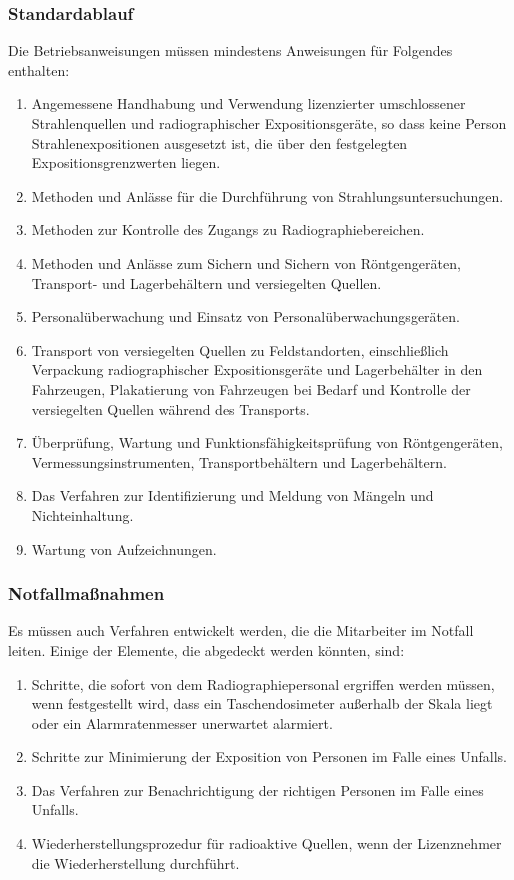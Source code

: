 {\subsubsection{Standardablauf}
Die Betriebsanweisungen müssen mindestens Anweisungen für Folgendes enthalten:
\begin{enumerate}
\item Angemessene Handhabung und Verwendung lizenzierter umschlossener Strahlenquellen und radiographischer Expositionsgeräte, so dass keine Person Strahlenexpositionen ausgesetzt ist, die über den festgelegten Expositionsgrenzwerten liegen.
\item Methoden und Anlässe für die Durchführung von Strahlungsuntersuchungen.
\item Methoden zur Kontrolle des Zugangs zu Radiographiebereichen.
\item Methoden und Anlässe zum Sichern und Sichern von Röntgengeräten, Transport- und Lagerbehältern und versiegelten Quellen.
\item Personalüberwachung und Einsatz von Personalüberwachungsgeräten.
\item Transport von versiegelten Quellen zu Feldstandorten, einschließlich Verpackung radiographischer Expositionsgeräte und Lagerbehälter in den Fahrzeugen, Plakatierung von Fahrzeugen bei Bedarf und Kontrolle der versiegelten Quellen während des Transports.
\item Überprüfung, Wartung und Funktionsfähigkeitsprüfung von Röntgengeräten, Vermessungsinstrumenten, Transportbehältern und Lagerbehältern.
\item Das Verfahren zur Identifizierung und Meldung von Mängeln und Nichteinhaltung.
\item Wartung von Aufzeichnungen.

\end{enumerate}

\subsubsection{Notfallmaßnahmen}
Es müssen auch Verfahren entwickelt werden, die die Mitarbeiter im Notfall leiten. Einige der Elemente, die abgedeckt werden könnten, sind:
\begin{enumerate}
\item Schritte, die sofort von dem Radiographiepersonal ergriffen werden müssen, wenn festgestellt wird, dass ein Taschendosimeter außerhalb der Skala liegt oder ein Alarmratenmesser unerwartet alarmiert.
\item Schritte zur Minimierung der Exposition von Personen im Falle eines Unfalls.
\item Das Verfahren zur Benachrichtigung der richtigen Personen im Falle eines Unfalls.
\item Wiederherstellungsprozedur für radioaktive Quellen, wenn der Lizenznehmer die Wiederherstellung durchführt.


\end{enumerate}}
